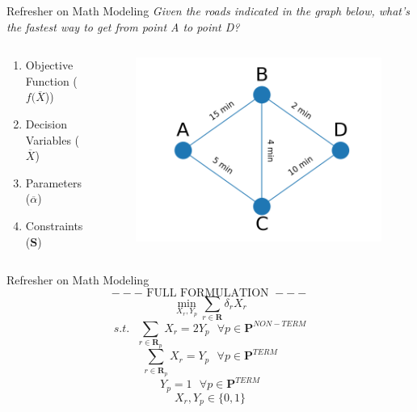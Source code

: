 \documentclass[10pt, aspectratio=169]{beamer}
\begin{document}
\begin{frame}{Refresher on Math Modeling}
    \textit{Given the roads indicated in the graph below, what's the fastest way to get from point A to point D?}

    \vspace{1.0cm}
    
    \begin{columns}
        \begin{column}{0.5\textwidth}
            \begin{enumerate}
                \item Objective Function ($f(\overline{X}$))
                \item Decision Variables ($\overline{X}$)
                \item Parameters ($\overline{\alpha}$)
                \item Constraints ($\textbf{S}$)
            \end{enumerate}
        \end{column}
        \begin{column}{0.5\textwidth}
            \begin{figure}
                \includegraphics[width=\linewidth]{../01_Introduction/RoutePlanningProblem.png}
            \end{figure}
        \end{column}
    \end{columns}
\end{frame}

\begin{frame}{Refresher on Math Modeling}
    $$---\text{ FULL FORMULATION }---$$
    $$\min_{X_r,Y_p} \sum_{r \in \textbf{R}} \delta_r X_r$$
    $$s.t.\ \ \ \sum_{r \in \textbf{R}_p} X_r = 2 Y_p \ \ \ \forall p \in \textbf{P}^{NON-TERM}$$
    $$\sum_{r \in \textbf{R}_p} X_r = Y_p \ \ \ \forall p \in \textbf{P}^{TERM}$$
    $$Y_p = 1 \ \ \ \forall p \in \textbf{P}^{TERM}$$
    $$X_r, Y_p \in \{0,1\}$$
\end{frame}
\end{document}
